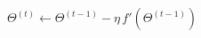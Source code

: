 \documentclass[preview]{standalone}
\begin{document}
\begin{align*}
\Theta^{(t)} \gets \Theta^{(t-1)} - \eta \, f'(\Theta^{(t-1)})
\end{align*}
\end{document}
